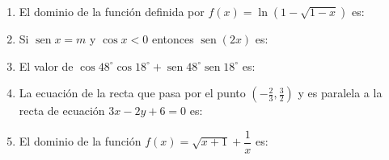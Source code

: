 \documentclass[11pt]{article}
\begin{document}
\begin{enumerate}
\item El dominio de la función definida por $f(x) = \ln\!\left(1 - \sqrt{1 - x}\right)$ es:
\begin{opciones}
\item $(-\infty, 1]$
\item $(-\infty, 0)$
\item $(0, 1]$
\item $(1, \infty)$
\end{opciones}

\item Si $\operatorname{sen} x = m$ y $\cos x < 0$ entonces $\operatorname{sen}(2x)$ es:

\item El valor de $\cos 48^\circ \cos 18^\circ + \operatorname{sen} 48^\circ \operatorname{sen} 18^\circ$ es:

\item La ecuación de la recta que pasa por el punto $\left(-\tfrac{2}{3}, \tfrac{3}{2}\right)$ y es paralela a la recta de ecuación $3x - 2y + 6 = 0$ es:

\item El dominio de la función $f(x) = \sqrt{x + 1} + \dfrac{1}{x}$ es:


\end{enumerate}
\end{document}

